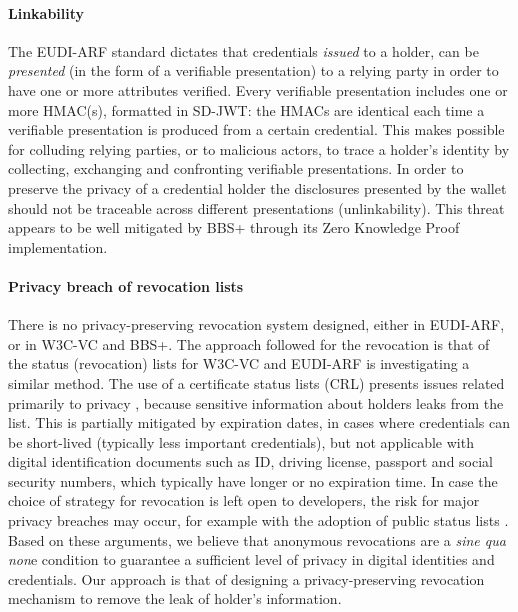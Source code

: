 \documentclass[conference]{IEEEtran}
\begin{document}
\paragraph{Linkability}

The EUDI-ARF standard dictates that credentials \textit{issued} to a holder, can be \textit{presented} (in the form of a verifiable presentation) to a relying party in order to have one or more attributes verified. Every verifiable presentation includes one or more HMAC(s), formatted in SD-JWT: the HMACs are identical each time a verifiable presentation is produced from a certain credential. This makes possible for colluding relying parties, or to malicious actors, to trace a holder's identity by collecting, exchanging and confronting verifiable presentations. In order to preserve the privacy of a credential holder the disclosures presented by the wallet should not be traceable across different presentations (unlinkability). This threat appears to be well mitigated by BBS+ through its Zero Knowledge Proof implementation.

\paragraph{Privacy breach of revocation lists}

There is no privacy-preserving revocation system designed, either in EUDI-ARF, or in W3C-VC and BBS+. The approach followed for the revocation is that of the status (revocation) lists \cite{status-lists} for W3C-VC and EUDI-ARF is investigating a similar method. The use of a certificate status lists (CRL) presents issues related primarily to privacy \cite{CRL}, because sensitive information about holders leaks from the list. This is partially mitigated by expiration dates, in cases where credentials can be short-lived (typically less important credentials), but not applicable with digital identification documents such as ID, driving license, passport and social security numbers, which typically have longer or no expiration time. In case the choice of strategy for revocation is left open to developers, the risk for major privacy breaches may occur, for example with the adoption of public status lists \cite{crlcomparison}. Based on these arguments, we believe that anonymous revocations are a \textit{sine qua non}e condition to guarantee a sufficient level of privacy in digital identities and credentials. Our approach is that of designing a privacy-preserving revocation mechanism to remove the leak of holder's information.
\end{document}
